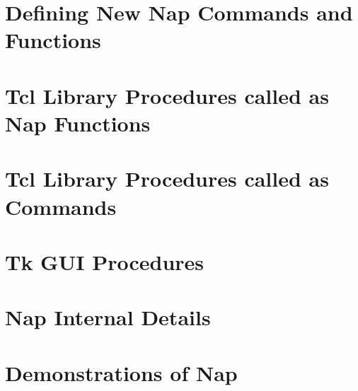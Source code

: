 \documentclass[a4paper]{book}
\begin{document}
\chapter{Defining New Nap Commands and Functions}
    
    

\chapter{Tcl Library Procedures called as Nap Functions}
    
    
    
    
    

\chapter{Tcl Library Procedures called as Commands}
    
    
    
    
    
    

\chapter{Tk GUI Procedures}
    
    
    
    

\chapter{Nap Internal Details}
    
    

\appendix
\chapter{Demonstrations of Nap}
    
    
    
    
    
    
    
    
    
    
    
    
\end{document}
